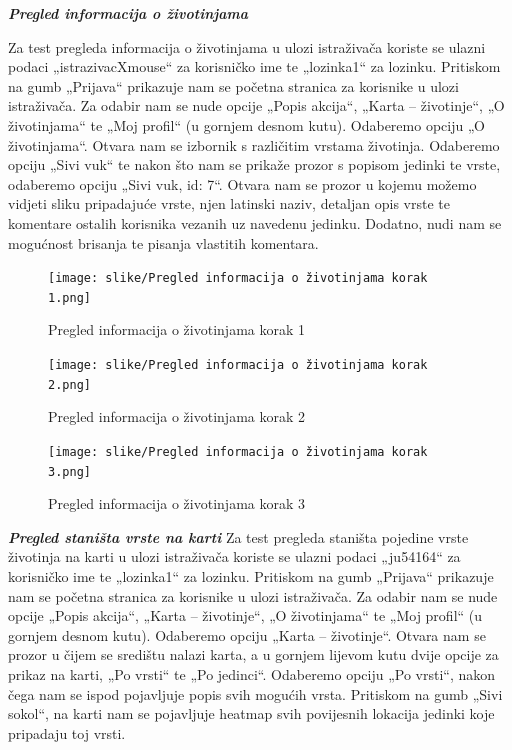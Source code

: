 			\textit{\textbf{Pregled informacija o životinjama}}
			\newline

			Za test pregleda informacija o životinjama u ulozi istraživača koriste se ulazni 
			podaci „istrazivacXmouse“ za korisničko ime te „lozinka1“ za lozinku. Pritiskom 
			na gumb „Prijava“ prikazuje nam se početna stranica za korisnike u ulozi 
			istraživača. Za odabir nam se nude opcije „Popis akcija“, „Karta – životinje“,
			 „O životinjama“ te „Moj profil“ (u gornjem desnom kutu). Odaberemo opciju 
			 „O životinjama“. Otvara nam se izbornik s različitim vrstama životinja. 
			 Odaberemo opciju „Sivi vuk“ te nakon što nam se prikaže prozor s popisom 
			 jedinki te vrste, odaberemo opciju „Sivi vuk, id: 7“. Otvara nam se prozor u 
			 kojemu možemo vidjeti sliku pripadajuće vrste, njen latinski naziv, detaljan opis 
			 vrste te komentare ostalih korisnika vezanih uz navedenu jedinku. Dodatno, nudi 
			 nam se mogućnost brisanja te pisanja vlastitih komentara.



			\begin{figure}[H]
				\texttt{[image: slike/Pregled informacija o životinjama korak 1.png]}
				\centering
				\caption{Pregled informacija o životinjama korak 1}
				\label{fig:Pregled informacija o životinjama korak 1}
			\end{figure}

			\begin{figure}[H]
				\texttt{[image: slike/Pregled informacija o životinjama korak 2.png]}
				\centering
				\caption{Pregled informacija o životinjama korak 2}
				\label{fig:Pregled informacija o životinjama korak 2}
			\end{figure}

			\begin{figure}[H]
				\texttt{[image: slike/Pregled informacija o životinjama korak 3.png]}
				\centering
				\caption{Pregled informacija o životinjama korak 3}
				\label{fig:Pregled informacija o životinjama korak 3}
			\end{figure}


			\textit{\textbf{Pregled staništa vrste na karti}}
			\newline
			Za test pregleda staništa pojedine vrste životinja na karti u ulozi istraživača 
			koriste se ulazni podaci „ju54164“ za korisničko ime te „lozinka1“ za lozinku. 
			Pritiskom na gumb „Prijava“ prikazuje nam se početna stranica za korisnike u 
			ulozi istraživača. Za odabir nam se nude opcije „Popis akcija“, 
			„Karta – životinje“, „O životinjama“ te „Moj profil“ (u gornjem desnom kutu). 
			Odaberemo opciju „Karta – životinje“. Otvara nam se prozor u čijem se središtu 
			nalazi karta, a u gornjem lijevom kutu dvije opcije za prikaz na karti, 
			„Po vrsti“ te „Po jedinci“. Odaberemo opciju „Po vrsti“, nakon čega nam se 
			ispod pojavljuje popis svih mogućih vrsta. Pritiskom na gumb „Sivi sokol“, 
			na karti nam se pojavljuje heatmap svih povijesnih lokacija jedinki koje 
			pripadaju toj vrsti. 


